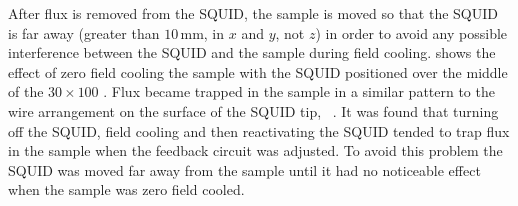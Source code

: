 %
%
%

After flux is removed from the SQUID, the sample is moved
so that the SQUID is far away (greater than
$10\,\mathrm{mm}$, in $x$ and $y$, not $z$) 
in order to 
avoid any possible interference between the SQUID and the sample during 
field cooling.  shows the effect of zero
field cooling the sample with the SQUID positioned over the middle of the 
$30 \times 100$ \jja. Flux became trapped in the sample in a similar pattern
to the wire arrangement on the surface of the SQUID tip, \cf\ 
. 
It was found that turning off the SQUID, field cooling and
then reactivating the SQUID tended to trap flux in the sample when the 
feedback circuit was adjusted. 
To avoid this problem the SQUID was moved far away 
from the sample
until it had no noticeable effect when the sample was
zero field cooled.




